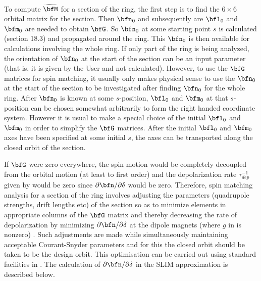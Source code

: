 {To compute $\widetilde \bfM$ for a section of the ring, the first step is to find the $6 \times 6$
orbital matrix for the section. Then $\bfn_0$ and subsequently are $\bfl_0$ and $\bfm_0$ are needed
to obtain $\bfG$.  So $\bfn_0$ at some starting point $s$ is calculated (section 18.3) and
propagated around the ring. This $\bfn_0$ is then available for calculations involving the whole
ring. If only part of the ring is being analyzed, the orientation of $\bfn_0$ at the start of the
section can be an input parameter (that is, it is given by the User and not calculated). However, to
use the $\bfG$ matrices for spin matching, it usually only makes physical sense to use the $\bfn_0$
at the start of the section to be investigated after finding $\bfn_0$ for the whole ring. After
$\bfn_0$ is known at some $s$-position, $\bfl_0$ and $\bfm_0$ at that $s$-position can be chosen
somewhat arbitrarily to form the right handed coordinate system. However it is usual to make a
special choice of the initial $\bfl_0$ and $\bfm_0$ in order to simplify the $\bfG$ matrices. After
the initial $\bfl_0$ and $\bfm_0$ axes have been specified at some initial $s$, the axes can be
transported along the closed orbit of the section.

If $\bfG$ were zero everywhere, the spin motion would be completely decoupled from the orbital
motion (at least to first order) and the depolarization rate $\tau_{dep}^{-1}$ given by 
would be zero since $\partial\bfn / \partial\delta$ would be zero. Therefore, spin matching analysis
for a section of the ring involves adjusting the parameters (quadrupole strengths, drift lengths
etc) of the section so as to minimize elements in appropriate columns of the $\bfG$ matrix and
thereby decreasing the rate of depolarization by minimizing $\partial\bfn/\partial\delta$ at the
dipole magnets (where $g$ in  is nonzero) \cite{b:barber99}. Such adjustments are made
while simultaneously maintaining acceptable Courant-Snyder parameters and for this the closed orbit
should be taken to be the design orbit.  This optimisation can be carried out using standard
facilities in \bmad. The calculation of $\partial\bfn/\partial\delta$ in the SLIM approximation is
described below.

}
